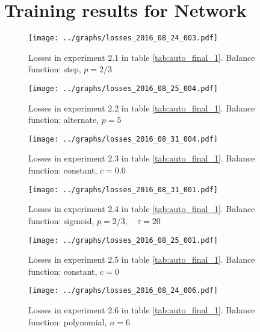\appendix
\chapter{Training results for Network \networkII} \label{appendix2}


      \begin{figure}[!h]
      \centering
      \texttt{[image: ../graphs/losses\_2016\_08\_24\_003.pdf]}
      \caption{Losses in experiment 2.1 in table \ref{tab:auto_final_1}. Balance function: step, $p=2/3$}
      \label{fig:alt1ernate}
      \end{figure}

      \begin{figure}[!h]
      \centering
      \texttt{[image: ../graphs/losses\_2016\_08\_25\_004.pdf]}
      \caption{Losses in experiment 2.2 in table \ref{tab:auto_final_1}. Balance function: alternate, $p=5$}
      \label{fig:alt2rnate}
      \end{figure}

      \begin{figure}[!h]
      \centering \texttt{[image: ../graphs/losses\_2016\_08\_31\_004.pdf]}
      \caption{Losses in experiment 2.3 in table \ref{tab:auto_final_1}. Balance function: constant, $c=0.0$}
      \label{fig:alter3nate} \end{figure}

      \begin{figure}[!h]
      \centering
      \texttt{[image: ../graphs/losses\_2016\_08\_31\_001.pdf]}
      \caption{Losses in experiment 2.4 in table \ref{tab:auto_final_1}. Balance function: sigmoid, $p=2/3,\quad \tau=20$}
      \label{fig:alter4nate}
      \end{figure}

      \begin{figure}[!h]
      \centering
      \texttt{[image: ../graphs/losses\_2016\_08\_25\_001.pdf]}
      \caption{Losses in experiment 2.5 in table \ref{tab:auto_final_1}. Balance function: constant, $c=0$}
      \label{fig:altern5ate}
      \end{figure}

      \begin{figure}[!h]
      \centering
      \texttt{[image: ../graphs/losses\_2016\_08\_24\_006.pdf]}
      \caption{Losses in experiment 2.6 in table \ref{tab:auto_final_1}. Balance function: polynomial, $n=6$}
      \label{fig:altern6ate}
      \end{figure}
